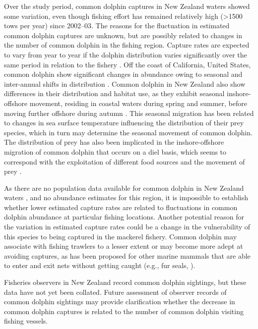 \documentclass[10pt]{article}
\begin{document}
Over the study period, common dolphin captures in New Zealand waters showed some variation, even though fishing effort has remained relatively high (\textgreater1500 tows per year) since \mbox{2002--03}. The reasons for the fluctuation in estimated common dolphin captures are unknown, but are possibly related to changes in the number of common dolphin in the fishing region.  
Capture rates are expected to vary from year to year
if the dolphin distribution varies significantly over the same period
in relation to the fishery  \cite{northridge_estimation_1996}.  Off
the coast of California, United States, common dolphin show
significant changes in abundance owing to seasonal and inter-annual
shifts in distribution \cite{forney_distribution_2006}.  Common dolphin in New Zealand also show differences in their distribution and habitat use, as they exhibit seasonal
inshore-offshore movement, residing in coastal waters during spring and summer, before moving further
offshore during autumn \cite{neumann_seasonal_2001}.  This seasonal migration has been related to changes in sea surface temperature influencing the distribution of their prey species, which in turn may determine the seasonal movement of common dolphin.  The distribution of prey has also been implicated in the inshore-offshore migration of common dolphin that occurs on a diel basis,
which seems to correspond with the exploitation of different food sources and the movement of prey \cite{meynier_stomach_2008}.

As there are
no population data available for common dolphin in New Zealand waters
\cite{stockin_thesis_2008}, and no abundance estimates for this
region, it is impossible to establish whether lower estimated capture
rates are related to fluctuations in common dolphin abundance at
particular fishing locations.  Another potential reason for the variation in estimated capture rates could be a change in the
vulnerability of this species to being captured in the mackerel
fishery.  Common dolphin may associate with fishing trawlers to a lesser extent or may become more adept at avoiding captures, as has been proposed for other marine mammals that are able to enter and exit nets without getting caught (e.g., fur seals, \cite{lyle_fur_2008}).   

Fisheries observers in New Zealand record common dolphin sightings, but these data have not yet been collated.  Future assessment of observer records of common dolphin sightings may provide clarification whether the decrease in common dolphin captures is related to the number of common dolphin visiting fishing vessels. 
\end{document}
